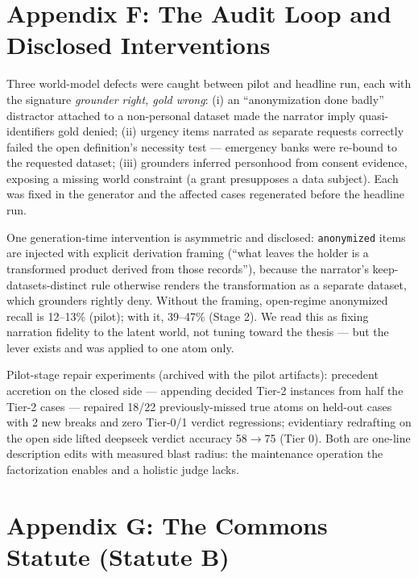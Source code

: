 \section{Appendix F: The Audit Loop and Disclosed Interventions}

Three world-model defects were caught between pilot and headline run, each
with the signature \emph{grounder right, gold wrong}: (i) an ``anonymization
done badly'' distractor attached to a non-personal dataset made the narrator
imply quasi-identifiers gold denied; (ii) urgency items narrated as separate
requests correctly failed the open definition's necessity test --- emergency
banks were re-bound to the requested dataset; (iii) grounders inferred
personhood from consent evidence, exposing a missing world constraint (a
grant presupposes a data subject). Each was fixed in the generator and the
affected cases regenerated before the headline run.

One generation-time intervention is asymmetric and disclosed:
\texttt{anonymized} items are injected with explicit derivation framing
(``what leaves the holder is a transformed product derived from those
records''), because the narrator's keep-datasets-distinct rule otherwise
renders the transformation as a separate dataset, which grounders rightly
deny. Without the framing, open-regime anonymized recall is 12--13\%
(pilot); with it, 39--47\% (Stage 2). We read this as fixing narration
fidelity to the latent world, not tuning toward the thesis --- but the lever
exists and was applied to one atom only.

Pilot-stage repair experiments (archived with the pilot artifacts):
precedent accretion on the closed side --- appending decided Tier-2
instances from half the Tier-2 cases --- repaired 18/22 previously-missed
true atoms on held-out cases with 2 new breaks and zero Tier-0/1 verdict
regressions; evidentiary redrafting on the open side lifted deepseek
verdict accuracy 58$\to$75 (Tier 0). Both are one-line description edits
with measured blast radius: the maintenance operation the factorization
enables and a holistic judge lacks.

\section{Appendix G: The Commons Statute (Statute B)}

